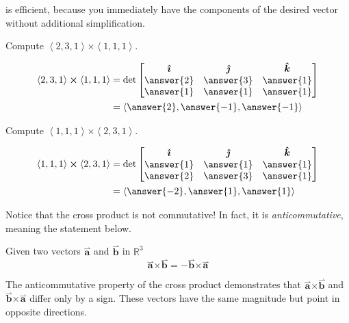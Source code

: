\documentclass{ximera}
\begin{document}
is efficient, because you immediately have the components of the
desired vector without additional simplification.

\begin{question}
  Compute $\left< 2,3,1 \right> \boldsymbol\times \left< 1,1,1 \right>$.
  \begin{prompt}
  \begin{align*}
  \left< 2,3,1 \right> \boldsymbol\times \left< 1,1,1 \right>
  &= \det \begin{bmatrix}
      \boldsymbol{\hat{\imath}} & \boldsymbol{\hat{\jmath}} & \boldsymbol{\hat{k}} \\
      \answer{2} & \answer{3} & \answer{1}\\
      \answer{1} & \answer{1} & \answer{1}
    \end{bmatrix}\\
    &= \left< \answer{2},\answer{-1},\answer{-1} \right>
  \end{align*}
  \end{prompt}
  \begin{question}
  Compute $\left< 1,1,1 \right> \boldsymbol\times \left< 2,3,1 \right>$.
  \begin{prompt}
  \begin{align*}
    \left< 1,1,1 \right> \boldsymbol\times \left< 2,3,1 \right>
    &=\det \begin{bmatrix}
      \boldsymbol{\hat{\imath}} & \boldsymbol{\hat{\jmath}} & \boldsymbol{\hat{k}} \\
      \answer{1} & \answer{1} & \answer{1}\\
      \answer{2} & \answer{3} & \answer{1}
    \end{bmatrix}\\
  &= \left< \answer{-2},\answer{1},\answer{1} \right>
  \end{align*}
  \end{prompt}
\end{question}
\end{question}


Notice that the cross product is not commutative! In fact, it is
\textit{anticommutative}, meaning the statement below.

\begin{theorem}
  Given two vectors $\overset{\boldsymbol{\rightharpoonup}}{\mathbf{a}}$ and $\overset{\boldsymbol{\rightharpoonup}}{\mathbf{b}}$ in $\mathbb{R}^3$
  \[
  \overset{\boldsymbol{\rightharpoonup}}{\mathbf{a}} \boldsymbol\times \overset{\boldsymbol{\rightharpoonup}}{\mathbf{b}} = -\overset{\boldsymbol{\rightharpoonup}}{\mathbf{b}} \boldsymbol\times \overset{\boldsymbol{\rightharpoonup}}{\mathbf{a}}
  \]
\end{theorem}
The anticommutative property of the cross product demonstrates that
$\overset{\boldsymbol{\rightharpoonup}}{\mathbf{a}} \boldsymbol\times \overset{\boldsymbol{\rightharpoonup}}{\mathbf{b}}$ and $\overset{\boldsymbol{\rightharpoonup}}{\mathbf{b}} \boldsymbol\times \overset{\boldsymbol{\rightharpoonup}}{\mathbf{a}}$ differ only by a
sign. These vectors have the same magnitude but point in opposite
directions.
\end{document}
